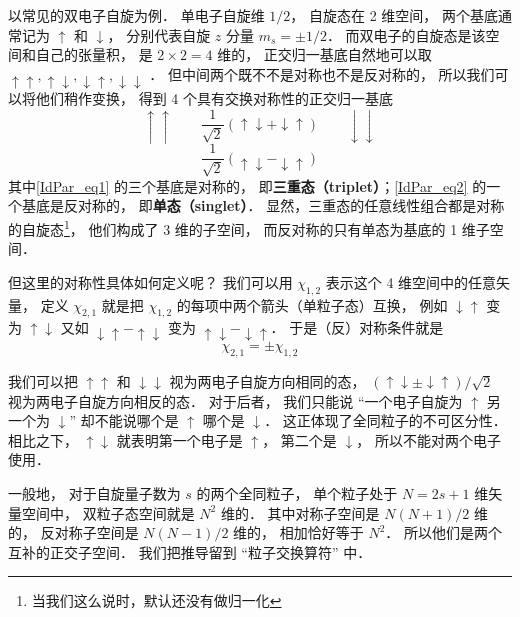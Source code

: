 \begin{example}{}\label{IdPar_ex1}
以常见的双电子自旋为例． 单电子自旋维 $1/2$， 自旋态在 2 维空间， 两个基底通常记为 $\uparrow$ 和 $\downarrow$， 分别代表自旋 $z$ 分量 $m_s=\pm 1/2$． 而双电子的自旋态是该空间和自己的张量积， 是 $2\times2 = 4$ 维的， 正交归一基底自然地可以取 $\uparrow\uparrow, \uparrow\downarrow, \downarrow\uparrow, \downarrow\downarrow$ ． 但中间两个既不不是对称也不是反对称的， 所以我们可以将他们稍作变换， 得到 4 个具有交换对称性的正交归一基底
\begin{equation}\label{IdPar_eq1}
\uparrow\uparrow \qquad \frac{1}{\sqrt 2}(\uparrow\downarrow + \downarrow\uparrow) \qquad \downarrow\downarrow
\end{equation}
\begin{equation}\label{IdPar_eq2}
\frac{1}{\sqrt 2}(\uparrow\downarrow - \downarrow\uparrow)
\end{equation}
其中\autoref{IdPar_eq1} 的三个基底是对称的， 即\textbf{三重态（triplet）}；\autoref{IdPar_eq2} 的一个基底是反对称的， 即\textbf{单态（singlet）}． %
显然，三重态的任意线性组合都是对称的自旋态\footnote{当我们这么说时，默认还没有做归一化}， 他们构成了 3 维的子空间， 而反对称的只有单态为基底的 1 维子空间．

但这里的对称性具体如何定义呢？ 我们可以用 $\chi_{1,2}$ 表示这个 4 维空间中的任意矢量， 定义 $\chi_{2,1}$ 就是把 $\chi_{1,2}$ 的每项中两个箭头（单粒子态）互换， 例如 $\downarrow\uparrow$ 变为 $\uparrow\downarrow$ 又如 $\downarrow\uparrow - \uparrow\downarrow$ 变为 $\uparrow\downarrow - \downarrow\uparrow$． 于是（反）对称条件就是
\begin{equation}\label{IdPar_eq3}
\chi_{2,1} = \pm\chi_{1,2}
\end{equation}

我们可以把 $\uparrow\uparrow$ 和 $\downarrow\downarrow$ 视为两电子自旋方向相同的态， $(\uparrow\downarrow \pm \downarrow\uparrow)/\sqrt{2}$ 视为两电子自旋方向相反的态． 对于后者， 我们只能说 “一个电子自旋为 $\uparrow$ 另一个为 $\downarrow$” 却不能说哪个是 $\uparrow$ 哪个是 $\downarrow$． 这正体现了全同粒子的不可区分性． 相比之下， $\uparrow\downarrow$ 就表明第一个电子是 $\uparrow$， 第二个是 $\downarrow$， 所以不能对两个电子使用．
\end{example}

一般地， 对于自旋量子数为 $s$ 的两个全同粒子， 单个粒子处于 $N = 2s+1$ 维矢量空间中， 双粒子态空间就是 $N^2$ 维的． 其中对称子空间是 $N(N+1)/2$ 维的， 反对称子空间是 $N(N-1)/2$ 维的， 相加恰好等于 $N^2$． 所以他们是两个互补的正交子空间． 我们把推导留到 “粒子交换算符” 中．

